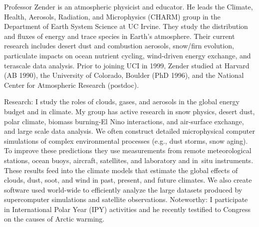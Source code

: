 \documentclass[12pt,twoside]{article}
\begin{document}
{{{%
Professor Zender is an atmospheric physicist and educator.  
He leads the Climate, Health, Aerosols, Radiation, and Microphysics
(CHARM) group in the Department of Earth System Science at UC Irvine.
They study the distribution and fluxes of energy and trace species
in Earth's atmosphere.  Their current research includes desert dust
and combustion aerosols, snow/firn evolution, particulate impacts on
ocean nutrient cycling, wind-driven energy exchange, and terascale
data analysis.  Prior to joining UCI in 1999, Zender studied at
Harvard (AB 1990), the University of Colorado, Boulder (PhD 1996), and
the National Center for Atmospheric Research (postdoc).

Research: I study the roles of clouds, gases, and aerosols in
the global energy budget and in climate.
My group has active research in snow physics, desert dust, polar
climate, biomass burning-El Nino interactions, and air-surface
exchange, and large scale data analysis.   
We often construct detailed microphysical computer simulations of
complex environmental processes (e.g., dust storms, snow aging). 
To improve these predictions they use measurements from 
remote meteorological stations, ocean buoys, aircraft, satellites, and
laboratory and in~situ instruments. 
These results feed into the climate models that estimate the global
effects of clouds, dust, soot, and wind in past, present, and future
climates.       
We also create software used world-wide to efficiently analyze the
large datasets produced by supercomputer simulations and satellite
observations.  
Noteworthy: I participate in International Polar Year (IPY) activities
and he recently testified to Congress on the causes of Arctic warming.   
} %
} %

\clearpage %

}
\end{document}
